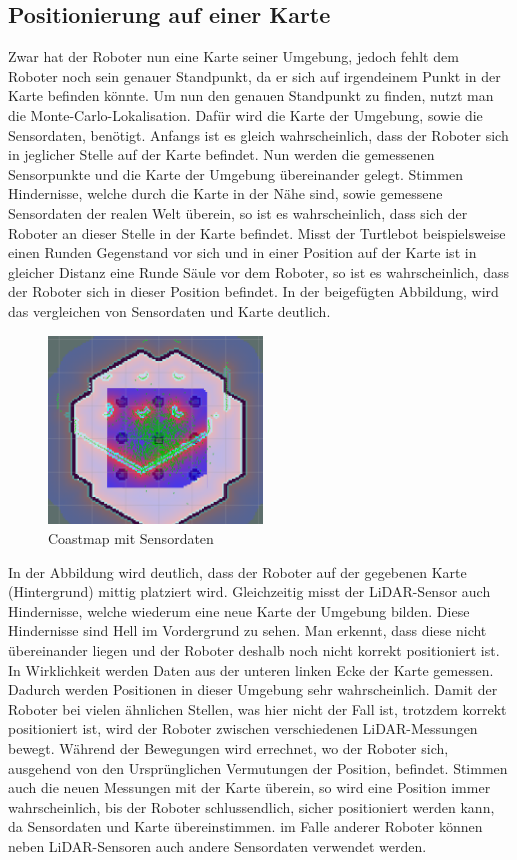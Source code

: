{{		\subsection{Positionierung auf einer Karte}
		{
			Zwar hat der Roboter nun eine Karte seiner Umgebung, jedoch fehlt dem Roboter noch sein genauer Standpunkt, da er sich auf irgendeinem Punkt in der Karte befinden könnte. Um nun den genauen Standpunkt zu finden, nutzt man die Monte-Carlo-Lokalisation. Dafür wird die Karte der Umgebung, sowie die Sensordaten, benötigt. Anfangs ist es gleich wahrscheinlich, dass der Roboter sich in jeglicher Stelle auf der Karte befindet. Nun werden die gemessenen Sensorpunkte und die Karte der Umgebung übereinander gelegt. Stimmen Hindernisse, welche durch die Karte in der Nähe sind, sowie gemessene Sensordaten der realen Welt überein, so ist es wahrscheinlich, dass sich der Roboter an dieser Stelle in der Karte befindet. Misst der Turtlebot beispielsweise einen Runden Gegenstand vor sich und in einer Position auf der Karte ist in gleicher Distanz eine Runde Säule vor dem Roboter, so ist es wahrscheinlich, dass der Roboter sich in dieser Position befindet. In der beigefügten Abbildung, wird das vergleichen von Sensordaten und Karte deutlich.
			\begin{figure}[H]
				\centering
				\includegraphics[height=5cm]{Bilder/coastmap_monte_carlo_example.png}
				\caption{Coastmap mit Sensordaten} 
				\label{pic:coastmontecarlo}
			\end{figure}
		In der Abbildung wird deutlich, dass der Roboter auf der gegebenen Karte (Hintergrund) mittig platziert wird. Gleichzeitig misst der LiDAR-Sensor auch Hindernisse, welche wiederum eine neue Karte der Umgebung bilden. Diese Hindernisse sind Hell im Vordergrund zu sehen. Man erkennt, dass diese nicht übereinander liegen und der Roboter deshalb noch nicht korrekt positioniert ist. In Wirklichkeit werden Daten aus der unteren linken Ecke der Karte gemessen. Dadurch werden Positionen in dieser Umgebung sehr wahrscheinlich. Damit der Roboter bei vielen ähnlichen Stellen, was hier nicht der Fall ist, trotzdem korrekt positioniert ist, wird der Roboter zwischen verschiedenen LiDAR-Messungen bewegt. Während der Bewegungen wird errechnet, wo der Roboter sich, ausgehend von den Ursprünglichen Vermutungen der Position, befindet. Stimmen auch die neuen Messungen mit der Karte überein, so wird eine Position immer wahrscheinlich, bis der Roboter schlussendlich, sicher positioniert werden kann, da Sensordaten und Karte übereinstimmen. im Falle anderer Roboter können neben LiDAR-Sensoren auch andere Sensordaten verwendet werden.
		}
}}
